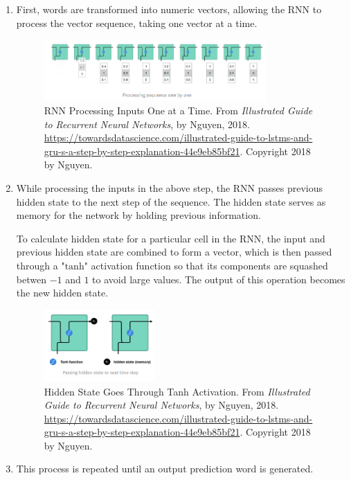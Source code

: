 \begin{enumerate}
    \item First, words are transformed into numeric vectors, allowing the RNN to process the vector sequence, taking one vector at a time. 
    
    \begin{figure}[h]
    \centering
    \includegraphics[width=0.8\textwidth]{imgs/rnn_step1.png}
    \caption{RNN Processing Inputs One at a Time. From \emph{Illustrated Guide to Recurrent Neural Networks}, by Nguyen, 2018. \url{https://towardsdatascience.com/illustrated-guide-to-lstms-and-gru-s-a-step-by-step-explanation-44e9eb85bf21}. Copyright 2018 by Nguyen.}
    \end{figure}
    
    \item While processing the inputs in the above step, the RNN passes previous hidden state to the next step of the sequence. The hidden state serves as memory for the network by holding previous information. 
    
    To calculate hidden state for a particular cell in the RNN, the input and previous hidden state are combined to form a vector, which is then passed through a $\text{"tanh"}$ activation function so that its components are squashed betwen $-1$ and $1$ to avoid large values. The output of this operation becomes the new hidden state. 
    
    \begin{figure}[h]
    \centering
    \includegraphics[width=0.4\textwidth]{imgs/rnn_step2.png}
    \caption{Hidden State Goes Through Tanh Activation. From \emph{Illustrated Guide to Recurrent Neural Networks}, by Nguyen, 2018. \url{https://towardsdatascience.com/illustrated-guide-to-lstms-and-gru-s-a-step-by-step-explanation-44e9eb85bf21}. Copyright 2018 by Nguyen.}
    \end{figure}
    
    \item This process is repeated until an output prediction word is generated. 
    
\end{enumerate}


